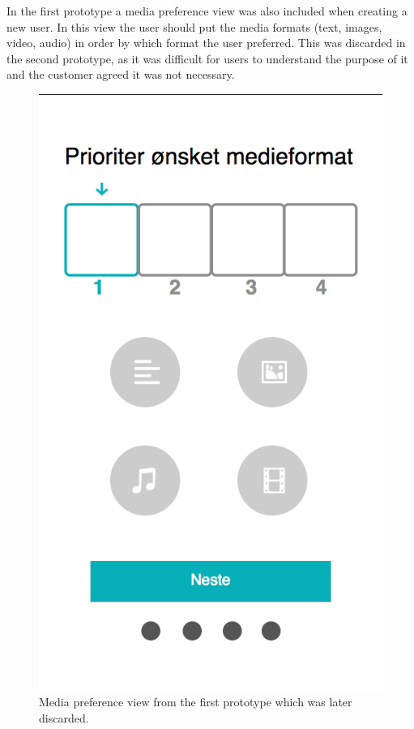 In the first prototype a media preference view was also included when creating a new user. In this view the user should put the media formats (text, images, video, audio) in order by which format the user preferred. This was discarded in the second prototype, as it was difficult for users to understand the purpose of it and the customer agreed it was not necessary. 
\begin{figure}[h]
	\centering
	\includegraphics[scale=0.5]{fig/prototype_media}
	\caption{Media preference view from the first prototype which was later discarded.}	
\end{figure}

